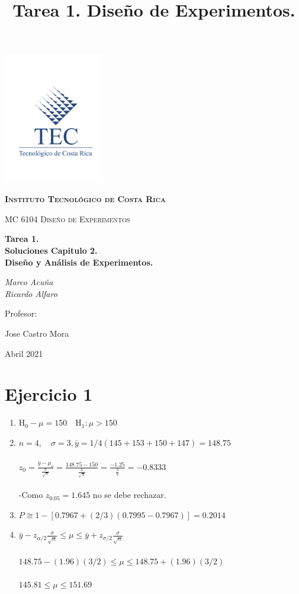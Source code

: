\documentclass[12pt,a4paper,table]{article}
\title{Tarea 1. Diseño de Experimentos.}
\begin{document}
\begin{titlepage}
	\centering
	\includegraphics[width=0.33\textwidth]{Teclogocompleto.jpg}\par\vspace{1cm}
	{\scshape\large \textbf{Instituto Tecnológico de Costa Rica }\par}
	\vspace{1cm}
	{\scshape\Large MC 6104 Diseño de Experimentos\par}
	\vspace{1.5cm}
	{\Large\bfseries 
	Tarea 1.\\ Soluciones Capitulo 2.\\ Diseño y Análisis de Experimentos.\par}
	\vspace{2cm}
	{\Large\itshape Marco Acuña  \\
	 Ricardo Alfaro\par}
	\vfill
	Profesor:\par
	Jose Castro Mora\textsc{}
	\vfill

	{\large} Abril 2021 \par
\end{titlepage}


\section*{Ejercicio 1}
\begin{enumerate}[label=(\alph*)]
    \item
    		$\mathrm{H}_{0}-\mu=150 \quad \mathrm{H}_{1}: \mu>150$
    \item
    		$n=4, \quad \sigma=3, \bar{y}=1 / 4(145+153+150+147)=148.75$ \\\\
$z_{0}=\frac{\bar{y}-\mu_{o}}{\frac{\sigma}{\sqrt{n}}}=\frac{148.75-150}{\frac{3}{\sqrt{4}}}=\frac{-1.25}{\frac{3}{2}}=-0.8333$\\\\
-Como $z_{0.05} = 1.645$ no se debe rechazar.
	\item
		$P \cong 1-[0.7967+(2 / 3)(0.7995-0.7967)]=0.2014$
	\item
		$\bar{y}-z_{\alpha / 2} \frac{\sigma}{\sqrt{n}} \leq \mu \leq \bar{y}+z_{\sigma / 2} \frac{\sigma}{\sqrt{n}}$\\\\
$148.75-(1.96)(3 / 2) \leq \mu \leq 148.75+(1.96)(3 / 2)$\\\\
$145.81 \leq \mu \leq 151.69$
\end{enumerate}
\end{document}

